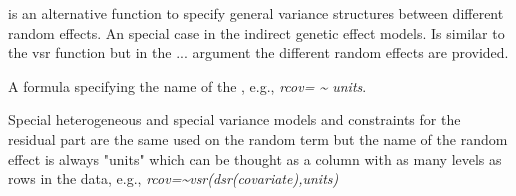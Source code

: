\documentclass[a4paper]{book}
\begin{document}
\begin{Arguments}
\begin{ldescription}
 is an alternative function to specify general
variance structures between different random effects. An special case in the 
indirect genetic effect models. Is similar to the vsr function but in the ... 
argument the different random effects are provided.


\item[\code{rcov}] A formula specifying the name of the , e.g., \emph{rcov= \textasciitilde{} units}.

Special heterogeneous and special variance models and constraints for the
residual part are the same used on the random term but the name of the random 
effect is always "units" which can be thought as a column with as many levels
as rows in the data, e.g., \emph{rcov=\textasciitilde{}vsr(dsr(covariate),units)}



\end{ldescription}
\end{Arguments}
\end{document}
